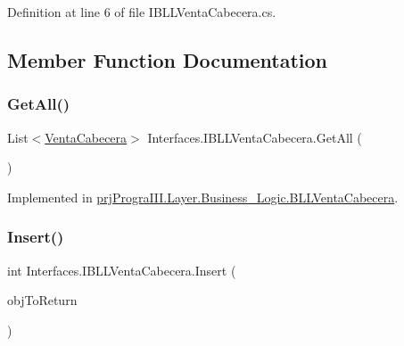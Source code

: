 Definition at line 6 of file I\+B\+L\+L\+Venta\+Cabecera.\+cs.



\subsection{Member Function Documentation}
\hypertarget{interface_interfaces_1_1_i_b_l_l_venta_cabecera_ae3e14c66210f1065c4633869c97a0efd}{}\label{interface_interfaces_1_1_i_b_l_l_venta_cabecera_ae3e14c66210f1065c4633869c97a0efd} 
\subsubsection{\texorpdfstring{Get\+All()}{GetAll()}}
{\footnotesize\ttfamily List$<$\hyperlink{classprj_progra_i_i_i_1_1_layer_1_1_entities_1_1_venta_cabecera}{Venta\+Cabecera}$>$ Interfaces.\+I\+B\+L\+L\+Venta\+Cabecera.\+Get\+All (\begin{DoxyParamCaption}{ }\end{DoxyParamCaption})}



Implemented in \hyperlink{classprj_progra_i_i_i_1_1_layer_1_1_business___logic_1_1_b_l_l_venta_cabecera_a11eecee0fcc7e296eb741393161a1739}{prj\+Progra\+I\+I\+I.\+Layer.\+Business\+\_\+\+Logic.\+B\+L\+L\+Venta\+Cabecera}.

\hypertarget{interface_interfaces_1_1_i_b_l_l_venta_cabecera_a28aab27efa8b0bfbac32d24d814e7a76}{}\label{interface_interfaces_1_1_i_b_l_l_venta_cabecera_a28aab27efa8b0bfbac32d24d814e7a76} 
\subsubsection{\texorpdfstring{Insert()}{Insert()}}
{\footnotesize\ttfamily int Interfaces.\+I\+B\+L\+L\+Venta\+Cabecera.\+Insert (\begin{DoxyParamCaption}\item[{\hyperlink{classprj_progra_i_i_i_1_1_layer_1_1_entities_1_1_venta_cabecera}{Venta\+Cabecera}}]{obj\+To\+Return }\end{DoxyParamCaption})}



